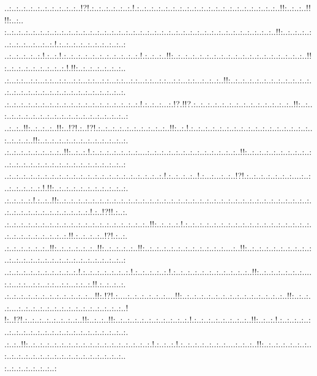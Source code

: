 \documentclass[paper=a4, fontsize=11pt]{scrartcl} %
\numberwithin{equation}{section} %
\numberwithin{figure}{section} %
\numberwithin{table}{section} %
\begin{document}
..:..:..:..:..:..:..:..:..:..:..!?!.:..:..:..:..:..:.!.:..:..:..:..:..:..:..:..:..:..:..:..:..:..:..:..:..:..:..:..!!:..:..:..!!!!:..:..\\:..:..:..:..:..:..:..:..:..:..:..:..:..:..:..:..:..:..:..:..:..:..:..:..:..:..:..:..:..:..:..:..:..:..:..:..:..:..!!:..:..:..:..:..:..:..:...:...:..:.!.:..:..:..:..:..:..:..:..:..:\\..:..:..:..:..:.!.:..:.!.:..:..:..:..:..:..:..:..:..:..:.!.:..:..:..!!:..:..:..:..:..:..:..:..:..:..:..:..:..:..:..:..:..:..:..!!:..:..:..:..:..:..:..:..:.!.!!:..:..:..:..:..:..:..\\.:...:.:...:.:...:.:...:.:...:.:...:.:...:.:...:.:...:.:...:.:...:.:...:.:...:.:...:..:..:..!!:..:..:..:..:..:..:..:..:..:..:..:..:..:..:..:..:..:..:..:..:..:..:..:..:..:..:..:..:.\\.:..:..:..:..:..:..:..:..:..:..:..:..:..:..:..:..:..:..:.!.:..:..:...:.!?.!!?.:..:..:..:..:..:..:..:..:..:..:..:..:..:..!!:..:..:..:..:..:..:..:..:..:..:..:..:..:..:..:..:..:..:..:\\..:..:..!!:..:..:..:..!!:..!?!.:..!?!.:..:..:..:..:..:..:..:..:..:..!!:..:.!.:..:..:..:..:..:..:..:..:..:..:..:..:..:..:..:..:..:..:..:..:..!!:..:..:..:..:..:..:..:..:..:..:..:..:.\\.:..:..:..:..:..:..:..:..!!:..:..:.!.:..:..:..:..:..:..:....:..:..:..:..:..:..:..:..:..:..:..:..:..!!:..:..:..:..:..:..:..:..:..:..:..:..:..:..:..:..:..:..:..:..:..:..:..:..:..:..:\\..:..:..:..:..:..:..:..:..:..:..:..:..:..:..:..:..:..:..:..:..:..:.!.:..:..:..:..!.:...:...:..:..!?!.:..:..:..:..:..:..:....:..:..:..:..:..:..:.!.!!:..:..:..:..:..:..:..:..:..:..:.\\.:..:..:..:.!.:..:..!!:..:..:..:..:..:..:..:..:..:..:..:..:..:..:..:..:..:..:..:..:..:..:..:..:..:..:..:..:..:..:..:..:..:..:..:..:..:..:..:..:..:..:..:..:..:..:..:.!.:..!?!!.:..:.\\.:..:..:..:..:..:..:..:..:..:..:..:..:..:..:..:..:..:..:..:..!!:..:..:..:.!.:..:..:..:..:..:..:..:..:..:..:..:..:..:..:..:..:..:..:..:..:..:..:..:..:..:..:.!!.:..:..:..:..!?!.:..:.\\.:..:..:..:..:..:..!!:..:..:..:..:..:..!!:..:..:..:..:..!!:..:..:..:..:..:..:..:..:..:..:..:....:..!!:..:..:..:..:..:..:..:..:..:..:..:..:..:..:..:..:..:..:..:..:..:..:..:..:..:..:\\..:..:..:..:..:..:..:..:..:..:.!.:..:..:..:..:..:..:.!.:..:..:..:..:.!.:..:..:..:..:..:..:..:..:..:..:..!!:..:..:..:..:..:..:....:.:...:.:...:.:...:.:...:.:...:.:..:.!!.:..:..:..:.\\.:..:..:..:..:..:..:..:..:..:..:..:...!!:.!?!.:....:..:..:..:..:..:....!!:..:..:..:..:..:..:..:..:..:..:..:..:..:..:..!!:..:..:..:....:..:..:..:..:..:..:..:..:..:..:..:..:..:..:..!\\!:..!?!.:..:..:..:..:..:..:..:..!!:..:..:..!!:..:..:..:..:..:..:..:..:..:..:.!.:..:..:..:..:..:..:..:..!!:..:..:.!.:..:..:..:..:..:..:..:..:..:..:..:..:..:..:..:..:..:..:..:..:..:.\\.:..:..!!:..:..:..:..:..:..:..:..:..:..:..:..:..:..:..:..:..:.!.:..:..:.!.:..:..:..:..:..:..:....:..:..:..!!:..:..:..:..:..:..:..:..:..:..:..:..:..:..:..:..:..:..:..:..:..:..:..:..\\:..:..:..:..:..:..:..:
\end{document}
